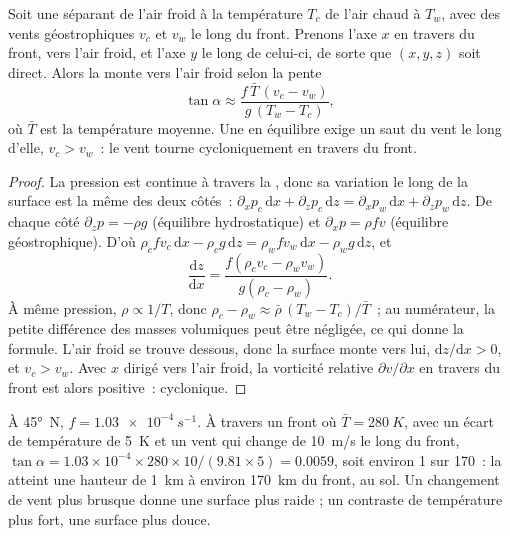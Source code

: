 \begin{proposition}\label{prop:b2:weather-systems:slope}
Soit une  séparant de l'air froid à la température $T_c$ de l'air chaud à $T_w$, avec des vents
géostrophiques $v_c$ et $v_w$ le long du front. Prenons l'axe $x$ en travers du front, vers l'air froid, et l'axe $y$
le long de celui-ci, de sorte que $(x, y, z)$ soit direct. Alors la  monte vers l'air froid
selon la pente
\[
  \tan\alpha \approx \frac{f\,\bar T\,(v_c - v_w)}{g\,(T_w - T_c)},
\]
où $\bar T$ est la température moyenne. Une  en équilibre exige un saut du vent le long d'elle,
$v_c > v_w$~: le vent tourne cycloniquement en travers du front.
\end{proposition}

\begin{proof}
La pression est continue à travers la , donc sa variation le long de la surface est la
même des deux côtés~: $\partial_x p_c\,\mathrm{d}x + \partial_z p_c\,\mathrm{d}z =
\partial_x p_w\,\mathrm{d}x + \partial_z p_w\,\mathrm{d}z$. De chaque côté $\partial_z p = -\rho g$
(équilibre hydrostatique) et $\partial_x p = \rho f v$ (équilibre géostrophique). D'où
$\rho_c f v_c\,\mathrm{d}x - \rho_c g\,\mathrm{d}z = \rho_w f v_w\,\mathrm{d}x - \rho_w
g\,\mathrm{d}z$, et
\[
  \frac{\mathrm{d}z}{\mathrm{d}x} = \frac{f(\rho_c v_c - \rho_w v_w)}{g(\rho_c - \rho_w)} .
\]
À même pression, $\rho \propto 1/T$, donc $\rho_c - \rho_w \approx \bar\rho\,(T_w -
T_c)/\bar T$~; au numérateur, la petite différence des masses volumiques peut être négligée, ce qui
donne la formule. L'air froid se trouve dessous, donc la surface monte vers lui, $\mathrm{d}z/
\mathrm{d}x > 0$, et $v_c > v_w$. Avec $x$ dirigé vers l'air froid, la vorticité relative
$\partial v/\partial x$ en travers du front est alors positive~: cyclonique.
\end{proof}

\begin{example}\label{ex:b2:weather-systems:slope}
À \ang{45}~N, $f = \qty{1.03e-4}{s^{-1}}$. À travers un front où $\bar T = \qty{280}{K}$, avec un écart
de température de \qty{5}{K} et un vent qui change de \qty{10}{m/s} le long du front, $\tan\alpha
= 1.03 \times 10^{-4} \times 280 \times 10/(9.81 \times 5) = 0.0059$, soit environ 1 sur 170~: la
 atteint une hauteur de \qty{1}{km} à environ \qty{170}{km} du front, au sol.
Un changement de vent plus brusque donne une surface plus raide ; un contraste de température plus fort, une surface plus douce.
\end{example}

